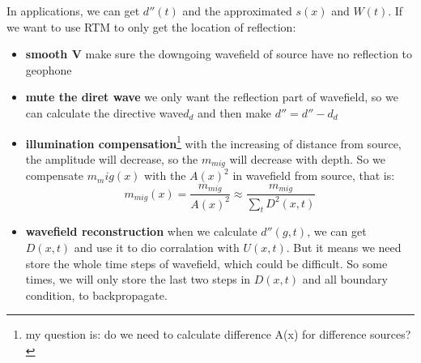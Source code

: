 \documentclass[a4paper]{article}
\begin{document}
	In applications, we can get $d''(t)$ and the approximated $s(x)$ and $W(t)$. If we want to use RTM to only get the location of reflection:
	\begin{itemize}
		\item \textbf{smooth V} make sure the downgoing wavefield of source have no reflection to geophone
		\item \textbf{mute the diret wave} we only want the reflection part of wavefield, so we can calculate the directive wave$d_d$ and then make $d''=d''-d_d$
		\item \textbf{illumination compensation}\footnote{my question is: do we need to calculate difference A(x) for difference sources?} with the increasing of distance from source, the amplitude will decrease, so the $m_{mig}$ will decrease with depth. So we compensate $m_mig(x)$ with the $A(x)^2$ in wavefield from source, that is:
		$$m_{mig}(x)=\frac{m_{mig}}{A(x)^2}\approx\frac{m_{mig}}{\sum_t D^2(x,t)}$$
		\item \textbf{wavefield reconstruction} when we calculate $d''(g,t)$, we can get $D(x,t)$ and use it to dio corralation with $U(x,t)$. But it means we need store the whole time steps of wavefield, which could be difficult. So some times, we will only store the last two steps in $D(x,t)$ and all boundary condition, to backpropagate.
	\end{itemize}
\end{document}
